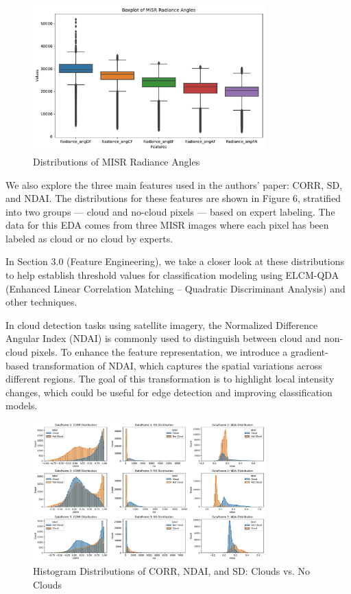 \documentclass[10pt,letterpaper]{article}
\begin{document}
\begin{figure}[H]
    \centering
    \includegraphics[width=0.8\textwidth]{my_boxplot.pdf}
    \caption{Distributions of MISR Radiance Angles}
    \label{Figure X}
\end{figure}

We also explore the three main features used in the authors’ paper: CORR, SD, and NDAI. The distributions for these features are shown in Figure 6, stratified into two groups — cloud and no-cloud pixels — based on expert labeling. The data for this EDA comes from three MISR images where each pixel has been labeled as cloud or no cloud by experts.

In Section 3.0 (Feature Engineering), we take a closer look at these distributions to help establish threshold values for classification modeling using ELCM-QDA (Enhanced Linear Correlation Matching – Quadratic Discriminant Analysis) and other techniques.

In cloud detection tasks using satellite imagery, the Normalized Difference Angular Index (NDAI) is commonly used to distinguish between cloud and non-cloud pixels. To enhance the feature representation, we introduce a gradient-based transformation of NDAI, which captures the spatial variations across different regions. The goal of this transformation is to highlight local intensity changes, which could be useful for edge detection and improving classification models. 


\begin{figure}[H]
    \centering
    \includegraphics[width=0.8\textwidth]{my_plot_features.pdf}
    \caption{Histogram Distributions of CORR, NDAI, and SD: Clouds vs. No Clouds}
    \label{Figure X}
\end{figure}
\end{document}
